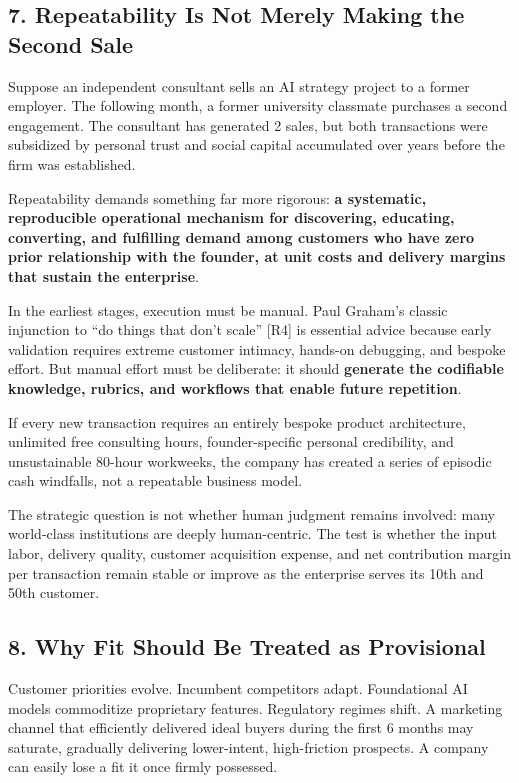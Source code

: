\subsection*{7. Repeatability Is Not Merely Making the Second Sale}

Suppose an independent consultant sells an AI strategy project to a former employer. The following month, a former university classmate purchases a second engagement. The consultant has generated 2 sales, but both transactions were subsidized by personal trust and social capital accumulated over years before the firm was established.

Repeatability demands something far more rigorous: \textbf{a systematic, reproducible operational mechanism for discovering, educating, converting, and fulfilling demand among customers who have zero prior relationship with the founder, at unit costs and delivery margins that sustain the enterprise}.

In the earliest stages, execution must be manual. Paul Graham's classic injunction to ``do things that don't scale'' [R4] is essential advice because early validation requires extreme customer intimacy, hands-on debugging, and bespoke effort. But manual effort must be deliberate: it should \textbf{generate the codifiable knowledge, rubrics, and workflows that enable future repetition}.

If every new transaction requires an entirely bespoke product architecture, unlimited free consulting hours, founder-specific personal credibility, and unsustainable 80-hour workweeks, the company has created a series of episodic cash windfalls, not a repeatable business model.

The strategic question is not whether human judgment remains involved: many world-class institutions are deeply human-centric. The test is whether the input labor, delivery quality, customer acquisition expense, and net contribution margin per transaction remain stable or improve as the enterprise serves its 10th and 50th customer.

\subsection*{8. Why Fit Should Be Treated as Provisional}

Customer priorities evolve. Incumbent competitors adapt. Foundational AI models commoditize proprietary features. Regulatory regimes shift. A marketing channel that efficiently delivered ideal buyers during the first 6 months may saturate, gradually delivering lower-intent, high-friction prospects. A company can easily lose a fit it once firmly possessed.

